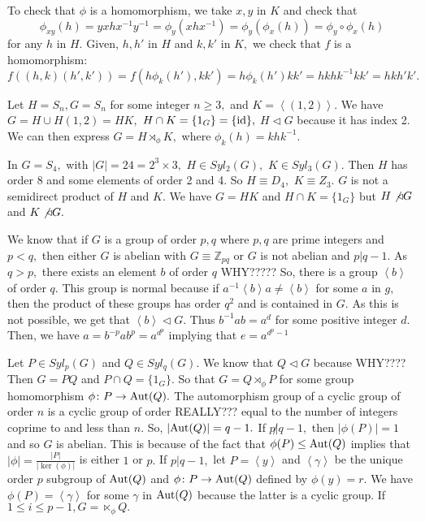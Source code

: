 To check that $\phi$ is a  homomorphism, we take $x,y$ in $K$ and check that
$$ \phi_{xy} (h) = y x h x^{-1} y^{-1} = \phi_y(x h x^{-1}) = \phi_y( \phi_x(h))
= \phi_y \circ \phi_x (h)$$
for  any $h$ in $H.$
Given, $h, h'$ in $H$ and $k, k'$ in $K,$ we check that $f$ is a homomorphism:
$$f((h,k)(h',k')) = f(h \phi_k(h'), kk') = h \phi_k(h') kk'
=  h k h k^{-1} k k' = hk h'k'.$$

\begin{example}
	Let $H = S_n, G = S_n$ for some integer $n \geq 3,$ and $ K = \left<(1,2) \right>.$
	We have $ G = H \cup H (1,2) = HK,$ $H \cap K = \{ 1_G \} = \{ \operatorname{id} \},$
	$H \triangleleft G$ because it has index 2.
	We can then express $G = H \rtimes_ \phi K,$ where $ \phi_k(h) = khk^{-1}.$
\end{example}

\begin{example}
	In $G = S_4,$ with $ \lvert G \rvert = 24 = 2^3 \times  3,$ $H \in Syl_2(G),$
	$K \in Syl_3(G).$ Then $H$ has order $8$ and some elements of order 2 and 4.
	So $H \equiv D_4,$ $K \equiv Z_3.$ $G$ is not a semidirect product of $H$ and $K.$
	We have $G =HK$ and $ H \cap K = \{ 1_G \}$ but $H \not \triangleleft G$ and
	$K \not \triangleleft G.$
\end{example}

\begin{example}
	We know that if $G$ is a group of order $p,q$ where $p,q$ are prime integers and $p < q,$
	then either $G$ is abelian with $G \equiv \mathbb{Z}_{pq}$ or $G$ is not abelian and
	$p | q-1.$
	As $q > p,$ there exists an element $b$ of order $q$ WHY?????
	So, there is a group $\left< b \right>$ of order $q.$ This group is normal because
	if $a^{-1} \left<b \right> a \not = \left< b \right>$ for some $a$ in $g,$
	then the product of these groups has order $q^2$ and is contained in $G.$
	As this is not possible, we get that $ \left<b \right> \triangleleft G.$
	Thus $b^{-1}ab = a^d$ for some positive integer $d.$ Then, we have
	$ a = b^{-p} a b^p = a^{d^p}$ implying that $e = a^{d^p -1} $
\end{example}

Let $P \in Syl_p(G)$ and $Q \in Syl_q(G).$ We know that $Q \triangleleft G$ because WHY????
Then $G = PQ$ and $ P \cap Q = \{ 1_G \}.$ So that $G = Q \rtimes_\phi P$ for some 
group homomorphism $ \phi \colon P \to \operatorname{Aut}(Q).$ The automorphism group of a cyclic group
of order $n$ is a cyclic group of order REALLY??? equal to the number of integers coprime 
to and less than $n.$ So, $ \lvert \operatorname{Aut}(Q) \rvert = q-1.$ If $ p\not | q-1,$ then $
\lvert \phi(P) \rvert = 1$ and so $G$ is abelian. This is because of
the fact that $\phi(P) \leq \operatorname{Aut}(Q)$ implies that $ \lvert \phi \rvert = \frac{ \lvert P
\rvert}{ \lvert \ker(\phi) \rvert}$ is either $1$ or $p.$
If $p | q-1,$ let $P = \left<y \right>$ and $\left< \gamma \right>$ be the unique order $p$
subgroup of $\operatorname{Aut}(Q)$ and $ \phi \colon P \to \operatorname{Aut}(Q)$ defined by $\phi(y) = r.$
We have $\phi(P) = \left< \gamma \right>$ for some $ \gamma$ in $\operatorname{Aut}(Q)$ because the
latter is a cyclic group. If $1 \leq i \leq p-1, G = \ltimes_ \phi Q.$


